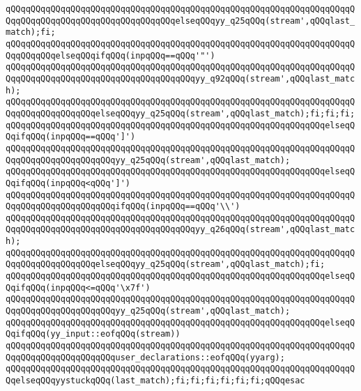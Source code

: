 \verb|qQQqqQQqqQQqqQQqqQQqqQQqqQQqqQQqqQQqqQQqqQQqqQQqqQQqqQQqqQQqqQQqqQQqqQQqqQQqqQQqqQQqqQQqqQQqqQQqqQQqqQQqelseqQQqyy_q25qQQq(stream',qQQqlast_match);fi;|\newline
\verb|qQQqqQQqqQQqqQQqqQQqqQQqqQQqqQQqqQQqqQQqqQQqqQQqqQQqqQQqqQQqqQQqqQQqqQQqqQQqqQQqelseqQQqifqQQq(inpqQQq==qQQq'"')|\newline
\verb|qQQqqQQqqQQqqQQqqQQqqQQqqQQqqQQqqQQqqQQqqQQqqQQqqQQqqQQqqQQqqQQqqQQqqQQqqQQqqQQqqQQqqQQqqQQqqQQqqQQqqQQqqQQqyy_q92qQQq(stream',qQQqlast_match);|\newline
\verb|qQQqqQQqqQQqqQQqqQQqqQQqqQQqqQQqqQQqqQQqqQQqqQQqqQQqqQQqqQQqqQQqqQQqqQQqqQQqqQQqqQQqqQQqelseqQQqyy_q25qQQq(stream',qQQqlast_match);fi;fi;fi;|\newline
\verb|qQQqqQQqqQQqqQQqqQQqqQQqqQQqqQQqqQQqqQQqqQQqqQQqqQQqqQQqqQQqqQQqelseqQQqifqQQq(inpqQQq==qQQq']')|\newline
\verb|qQQqqQQqqQQqqQQqqQQqqQQqqQQqqQQqqQQqqQQqqQQqqQQqqQQqqQQqqQQqqQQqqQQqqQQqqQQqqQQqqQQqqQQqqQQqyy_q25qQQq(stream',qQQqlast_match);|\newline
\verb|qQQqqQQqqQQqqQQqqQQqqQQqqQQqqQQqqQQqqQQqqQQqqQQqqQQqqQQqqQQqqQQqelseqQQqifqQQq(inpqQQq<qQQq']')|\newline
\verb|qQQqqQQqqQQqqQQqqQQqqQQqqQQqqQQqqQQqqQQqqQQqqQQqqQQqqQQqqQQqqQQqqQQqqQQqqQQqqQQqqQQqqQQqqQQqifqQQq(inpqQQq==qQQq'\\')|\newline
\verb|qQQqqQQqqQQqqQQqqQQqqQQqqQQqqQQqqQQqqQQqqQQqqQQqqQQqqQQqqQQqqQQqqQQqqQQqqQQqqQQqqQQqqQQqqQQqqQQqqQQqqQQqqQQqyy_q26qQQq(stream',qQQqlast_match);|\newline
\verb|qQQqqQQqqQQqqQQqqQQqqQQqqQQqqQQqqQQqqQQqqQQqqQQqqQQqqQQqqQQqqQQqqQQqqQQqqQQqqQQqqQQqqQQqelseqQQqyy_q25qQQq(stream',qQQqlast_match);fi;|\newline
\verb|qQQqqQQqqQQqqQQqqQQqqQQqqQQqqQQqqQQqqQQqqQQqqQQqqQQqqQQqqQQqqQQqelseqQQqifqQQq(inpqQQq<=qQQq'\x7f')|\newline
\verb|qQQqqQQqqQQqqQQqqQQqqQQqqQQqqQQqqQQqqQQqqQQqqQQqqQQqqQQqqQQqqQQqqQQqqQQqqQQqqQQqqQQqqQQqqQQqyy_q25qQQq(stream',qQQqlast_match);|\newline
\verb|qQQqqQQqqQQqqQQqqQQqqQQqqQQqqQQqqQQqqQQqqQQqqQQqqQQqqQQqqQQqqQQqelseqQQqifqQQq(yy_input::eofqQQq(stream))|\newline
\verb|qQQqqQQqqQQqqQQqqQQqqQQqqQQqqQQqqQQqqQQqqQQqqQQqqQQqqQQqqQQqqQQqqQQqqQQqqQQqqQQqqQQqqQQqqQQquser_declarations::eofqQQq(yyarg);|\newline
\verb|qQQqqQQqqQQqqQQqqQQqqQQqqQQqqQQqqQQqqQQqqQQqqQQqqQQqqQQqqQQqqQQqqQQqqQQqelseqQQqyystuckqQQq(last_match);fi;fi;fi;fi;fi;fi;qQQqesac|\newline
